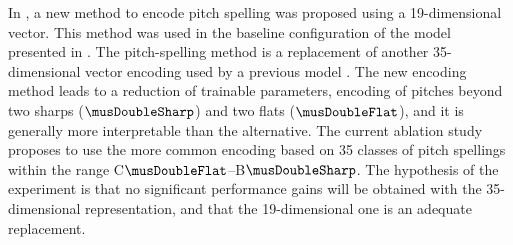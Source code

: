 
In , a new method to encode
pitch spelling was proposed using a 19-dimensional vector.
This method was used in the baseline configuration of the
model presented in . The pitch-spelling
method is a replacement of another 35-dimensional vector
encoding used by a previous model
\parencite{micchi2021deep}. The new encoding method leads to
a reduction of trainable parameters, encoding of pitches
beyond two sharps ($\musDoubleSharp$) and two flats
($\musDoubleFlat$), and it is generally more interpretable
than the alternative. The current ablation study proposes to
use the more common encoding based on 35 classes of pitch
spellings within the range
C$\musDoubleFlat$--B$\musDoubleSharp$. The hypothesis of the
experiment is that no significant performance gains will be
obtained with the 35-dimensional representation, and that
the 19-dimensional one is an adequate replacement.
